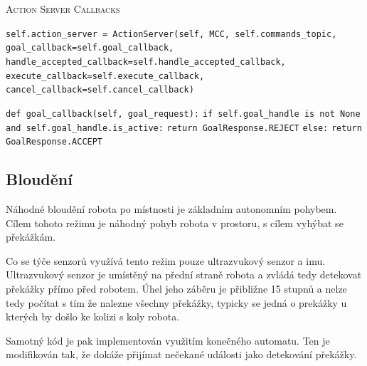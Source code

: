 \begin{algorithm}[h!]
	\label{}
	\caption{\textsc{Action Server Callbacks}}
	
	\DontPrintSemicolon
	\SetAlgoNoLine
	\SetNlSty{}{}{:}
	\SetNlSkip{-1.1em}
	
	\BlankLine \Indp\Indpp
	
	\texttt{self.action\_server = ActionServer(self, MCC, self.commands\_topic,}\;
	\Indp\Indp
	\texttt{goal\_callback=self.goal\_callback,}\;
	\texttt{handle\_accepted\_callback=self.handle\_accepted\_callback,}\;
	\texttt{execute\_callback=self.execute\_callback,}\;
	\texttt{cancel\_callback=self.cancel\_callback)}\;
	\Indm\Indm

	\BlankLine
	\texttt{def goal\_callback(self, goal\_request):}\;
	\Indp\Indp
	\texttt{if self.goal\_handle is not None and self.goal\_handle.is\_active:}\;
	\Indp\Indp
	\texttt{return GoalResponse.REJECT}\;
	\Indm\Indm
	\texttt{else:}\;
	\Indp\Indp
	\texttt{return GoalResponse.ACCEPT}\;

\end{algorithm}

\subsection*{Bloudění}
Náhodné bloudění robota po místnosti je základním autonomním pohybem. Cílem tohoto režimu je náhodný pohyb robota v prostoru, s cílem vyhýbat se překážkám.

Co se týče senzorů využívá tento režim pouze ultrazvukový senzor a imu. Ultrazvukový senzor je umístěný na přední straně robota a zvládá tedy detekovat překážky přímo před robotem. Úhel jeho záběru je přibližne 15 stupnů a nelze tedy počítat s tím že nalezne všechny překážky, typicky se jedná o prekážky u kterých by došlo ke kolizi s koly robota. 

Samotný kód je pak implementován využitím konečného automatu. Ten je modifikován tak, že dokáže přijímat nečekané události jako detekování překážky. 

